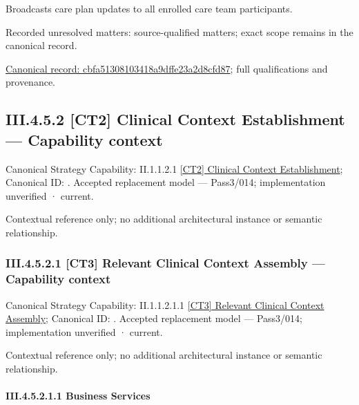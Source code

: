 Broadcasts care plan updates to all enrolled care team participants.


{\small Recorded unresolved matters: source-qualified matters; exact scope remains in the canonical record.}\par
{\footnotesize \href{../../../../../../../continuum/business/business-function/cbfa51308103418a9dffe23a2d8cfd87.md}{Canonical record: cbfa51308103418a9dffe23a2d8cfd87}; full qualifications and provenance.}\par
\subsection*{III.4.5.2 [CT2] Clinical Context Establishment — Capability context}
\label{navigation:III.4.5.2}

{\small Canonical Strategy Capability: II.1.1.2.1 \hyperref[element:7b398aa81bbc43e7a3868e5d85e30a1d]{[CT2] Clinical Context Establishment}; Canonical ID: \texttt{}. Accepted replacement model — Pass3/014; implementation unverified · current.}\par
Contextual reference only; no additional architectural instance or semantic relationship.\par
\subsubsection*{III.4.5.2.1 [CT3] Relevant Clinical Context Assembly — Capability context}
\label{navigation:III.4.5.2.1}

{\small Canonical Strategy Capability: II.1.1.2.1.1 \hyperref[element:32bdf554780d4d6081fc3726fbba11df]{[CT3] Relevant Clinical Context Assembly}; Canonical ID: \texttt{}. Accepted replacement model — Pass3/014; implementation unverified · current.}\par
Contextual reference only; no additional architectural instance or semantic relationship.\par
\paragraph*{III.4.5.2.1.1 Business Services}
\label{navigation:III.4.5.2.1.1}


